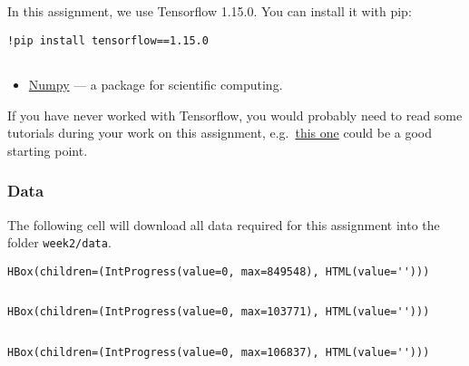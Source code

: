\documentclass[11pt]{article}
\providecommand{\tightlist}{%
      \setlength{\itemsep}{0pt}\setlength{\parskip}{0pt}}
\begin{document}
In this assignment, we use Tensorflow 1.15.0. You can install it with
pip:

\begin{verbatim}
!pip install tensorflow==1.15.0
 
\end{verbatim}

\begin{itemize}
\tightlist
\item
  \href{http://www.numpy.org}{Numpy} --- a package for scientific
  computing.
\end{itemize}

If you have never worked with Tensorflow, you would probably need to
read some tutorials during your work on this assignment,
e.g.~\href{https://www.tensorflow.org/tutorials/recurrent}{this one}
could be a good starting point.

    \hypertarget{data}{%
\subsubsection{Data}\label{data}}

The following cell will download all data required for this assignment
into the folder \texttt{week2/data}.

    
    \begin{verbatim}
HBox(children=(IntProgress(value=0, max=849548), HTML(value='')))
    \end{verbatim}

    
    \begin{Verbatim}[commandchars=\\\{\}]

    \end{Verbatim}

    
    \begin{verbatim}
HBox(children=(IntProgress(value=0, max=103771), HTML(value='')))
    \end{verbatim}

    
    \begin{Verbatim}[commandchars=\\\{\}]

    \end{Verbatim}

    
    \begin{verbatim}
HBox(children=(IntProgress(value=0, max=106837), HTML(value='')))
    \end{verbatim}

    
    \begin{Verbatim}[commandchars=\\\{\}]

    \end{Verbatim}
\end{document}
